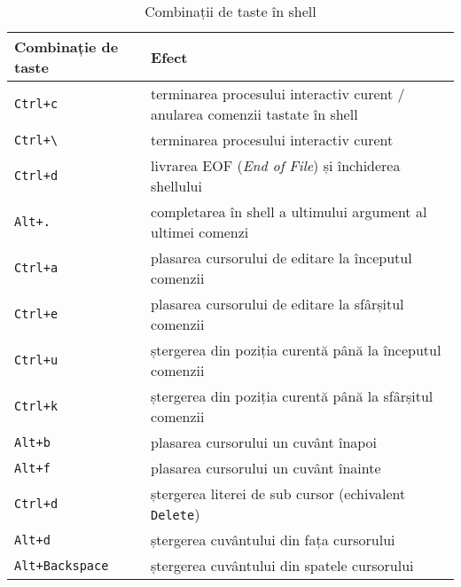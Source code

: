\begin{table}[!htb]
  \caption{Combinații de taste în shell}
  \begin{center}
    \begin{tabular}{ p{} p{} }
      \toprule
        \textbf{Combinație de taste} &
        \textbf{Efect} \\
      \midrule
        \texttt{Ctrl+c} &
        terminarea procesului interactiv curent / anularea comenzii tastate în shell \\

        \texttt{Ctrl+\textbackslash{}} &
        terminarea procesului interactiv curent \\

        \texttt{Ctrl+d} &
        livrarea EOF (\textit{End of File}) și închiderea shellului \\

        \texttt{Alt+.} &
        completarea în shell a ultimului argument al ultimei comenzi \\

        \texttt{Ctrl+a} &
        plasarea cursorului de editare la începutul comenzii \\

        \texttt{Ctrl+e} &
        plasarea cursorului de editare la sfârșitul comenzii \\

        \texttt{Ctrl+u} &
        ștergerea din poziția curentă până la începutul comenzii \\

        \texttt{Ctrl+k} &
        ștergerea din poziția curentă până la sfârșitul comenzii \\

        \texttt{Alt+b} &
        plasarea cursorului un cuvânt înapoi \\

        \texttt{Alt+f} &
        plasarea cursorului un cuvânt înainte \\

        \texttt{Ctrl+d} &
        ștergerea literei de sub cursor (echivalent \texttt{Delete}) \\

        \texttt{Alt+d} &
        ștergerea cuvântului din fața cursorului \\

        \texttt{Alt+Backspace} &
        ștergerea cuvântului din spatele cursorului \\
      \bottomrule
    \end{tabular}
    \label{tab:cli:key-bindings}
  \end{center}
\end{table}

